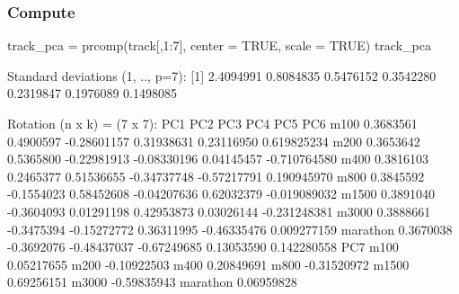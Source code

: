 \documentclass[a4paper]{article}\usepackage[]{graphicx}\usepackage[]{xcolor}
\begin{document}
\subsubsection{Compute}
\begin{Schunk}
\begin{Sinput}
track_pca = prcomp(track[,1:7], center = TRUE, scale = TRUE)
track_pca
\end{Sinput}
\begin{Soutput}
Standard deviations (1, .., p=7):
[1] 2.4094991 0.8084835 0.5476152 0.3542280 0.2319847 0.1976089 0.1498085

Rotation (n x k) = (7 x 7):
               PC1        PC2         PC3         PC4         PC5          PC6
m100     0.3683561  0.4900597 -0.28601157  0.31938631  0.23116950  0.619825234
m200     0.3653642  0.5365800 -0.22981913 -0.08330196  0.04145457 -0.710764580
m400     0.3816103  0.2465377  0.51536655 -0.34737748 -0.57217791  0.190945970
m800     0.3845592 -0.1554023  0.58452608 -0.04207636  0.62032379 -0.019089032
m1500    0.3891040 -0.3604093  0.01291198  0.42953873  0.03026144 -0.231248381
m3000    0.3888661 -0.3475394 -0.15272772  0.36311995 -0.46335476  0.009277159
marathon 0.3670038 -0.3692076 -0.48437037 -0.67249685  0.13053590  0.142280558
                 PC7
m100      0.05217655
m200     -0.10922503
m400      0.20849691
m800     -0.31520972
m1500     0.69256151
m3000    -0.59835943
marathon  0.06959828
\end{Soutput}
\end{Schunk}
\end{document}
